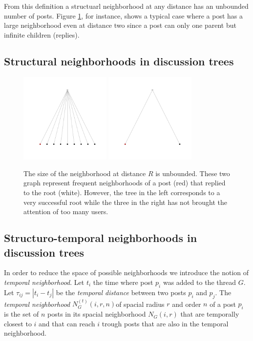\documentclass[smallextended]{svjour3}          %
\begin{document}
From this definition a structuarl neighborhood at any distance has an unbounded number of posts. Figure \ref{fig:large_neighboorhood}, for instance, shows a typical case where a post has a large neighborhood even at distance two since a post can only one parent but infinite children (replies).


\subsection{Structural neighborhoods in discussion trees}


\begin{figure}
	\centering
	\includegraphics[width=0.4\textwidth]{large_neighborhood}
	\includegraphics[width=0.4\textwidth]{small_neighborhood}
	\caption{The size of the neighborhood at distance $R$ is unbounded. These two graph represent frequent neighborhoods of a post (red) that replied to the root (white). However, the tree in the left corresponds to a very successful root while the three in the right has not brought the attention of too many users.}
	\label{fig:large_neighboorhood}
\end{figure}
\subsection{Structuro-temporal neighborhoods in discussion trees}
In order to reduce the space of possible neighborhoods we introduce the notion of \textit{temporal neighborhood}. Let $t_i$ the time where post $p_i$ was added to the thread $G$. Let $\tau_{ij}=|t_i-t_j|$ be the \textit{temporal distance} between two posts $p_i$ and $p_j$. The \textit{temporal neighborhood} $N_{G}^{(t)}(i, r, n)$of spacial radius $r$ and order $n$ of a post $p_i$ is the set of $n$ posts in its spacial neighborhood $N_{G}(i, r)$ that are temporally closest to $i$ and that can reach $i$ trough posts that are also in the temporal neighborhood.
\end{document}
